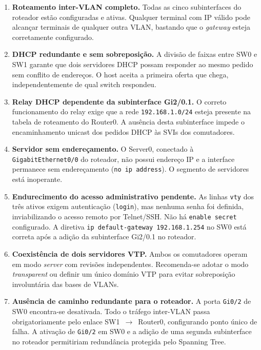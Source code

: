 \begin{enumerate}[leftmargin=2em]
  \item \textbf{Roteamento inter-VLAN completo.} Todas as cinco subinterfaces
        do roteador estão configuradas e ativas. Qualquer terminal com IP válido
        pode alcançar terminais de qualquer outra VLAN, bastando que o \textit{gateway}
        esteja corretamente configurado.

  \item \textbf{DHCP redundante e sem sobreposição.} A divisão de faixas entre SW0
        e SW1 garante que dois servidores DHCP possam responder ao mesmo pedido sem
        conflito de endereços. O host aceita a primeira oferta que chega,
        independentemente de qual switch respondeu.

  \item \textbf{Relay DHCP dependente da subinterface Gi2/0.1.} O correto
        funcionamento do relay exige que a rede \texttt{192.168.1.0/24} esteja
        presente na tabela de roteamento do Router0. A ausência desta subinterface
        impede o encaminhamento unicast dos pedidos DHCP às SVIs dos comutadores.

  \item \textbf{Servidor sem endereçamento.} O Server0, conectado à
        \texttt{GigabitEthernet0/0} do roteador, não possui endereço IP
        e a interface permanece sem endereçamento (\texttt{no ip address}).
        O segmento de servidores está inoperante.

  \item \textbf{Endurecimento do acesso administrativo pendente.} As linhas
        \texttt{vty} dos três ativos exigem autenticação (\texttt{login}), mas
        nenhuma senha foi definida, inviabilizando o acesso remoto por Telnet/SSH.
        Não há \texttt{enable secret} configurado. A diretiva
        \texttt{ip default-gateway 192.168.1.254} no SW0 está correta após a
        adição da subinterface Gi2/0.1 no roteador.

  \item \textbf{Coexistência de dois servidores VTP.} Ambos os comutadores operam
        em modo \textit{server} com revisões independentes. Recomenda-se adotar
        o modo \textit{transparent} ou definir um único domínio VTP para evitar
        sobreposição involuntária das bases de VLANs.

  \item \textbf{Ausência de caminho redundante para o roteador.} A porta
        \texttt{Gi0/2} de SW0 encontra-se desativada. Todo o tráfego inter-VLAN
        passa obrigatoriamente pelo enlace SW1~$\rightarrow$~Router0, configurando
        ponto único de falha. A ativação de \texttt{Gi0/2} em SW0 e a adição de
        uma segunda subinterface no roteador permitiriam redundância protegida
        pelo Spanning Tree.
\end{enumerate}

